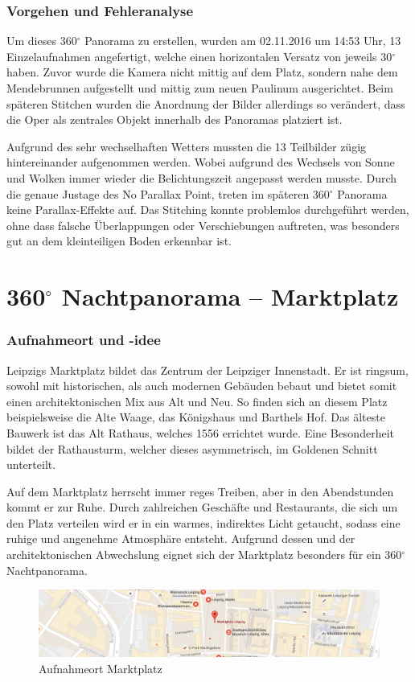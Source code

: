 \documentclass[liststotoc,bibtotoc,fontsize=14pt,]{scrreprt}
\begin{document}
	\subsubsection{Vorgehen und Fehleranalyse}
	Um dieses 360$^\circ$ Panorama zu erstellen, wurden am 02.11.2016 um 14:53 Uhr, 13 Einzelaufnahmen angefertigt, welche einen horizontalen Versatz von jeweils 30$^\circ$ haben. Zuvor wurde die Kamera nicht mittig auf dem Platz, sondern nahe dem Mendebrunnen aufgestellt und mittig zum neuen Paulinum ausgerichtet. Beim späteren Stitchen wurden die Anordnung der Bilder allerdings so verändert, dass die Oper als zentrales Objekt innerhalb des Panoramas platziert ist. 
	
	\bigskip
		Aufgrund des sehr wechselhaften Wetters mussten die 13 Teilbilder zügig hintereinander aufgenommen werden. Wobei aufgrund des Wechsels von Sonne und Wolken immer wieder die Belichtungszeit angepasst werden musste. Durch die genaue Justage des No Parallax Point, treten im späteren 360$^\circ$ Panorama keine Parallax-Effekte auf. Das Stitching konnte problemlos durchgeführt werden, ohne dass falsche Überlappungen oder Verschiebungen auftreten, was besonders gut an dem kleinteiligen Boden erkennbar ist.

	
	\section{360$^\circ$ Nachtpanorama -- Marktplatz}
	\label{sec:markt}
		\subsubsection{Aufnahmeort und -idee}
		Leipzigs Marktplatz bildet das Zentrum der Leipziger Innenstadt. Er ist ringsum, sowohl mit historischen, als auch modernen Gebäuden bebaut und bietet somit einen architektonischen Mix aus Alt und Neu. So finden sich an diesem Platz beispielsweise die Alte Waage, das Königshaus und Barthels Hof. Das älteste Bauwerk ist das Alt Rathaus, welches 1556 errichtet wurde. Eine Besonderheit bildet der Rathausturm, welcher dieses asymmetrisch, im Goldenen Schnitt unterteilt. 
		
		\bigskip
		Auf dem Marktplatz herrscht immer reges Treiben, aber in den Abendstunden kommt er zur Ruhe. Durch zahlreichen Geschäfte und Restaurants, die sich um den Platz verteilen wird er in ein warmes, indirektes Licht getaucht, sodass eine ruhige und angenehme Atmosphäre entsteht. Aufgrund dessen und der architektonischen Abwechslung eignet sich der Marktplatz besonders für ein 360$^\circ$ Nachtpanorama.
		\begin{figure}[H]
			\includegraphics[width=\linewidth]{img/places/mp_map.jpg}
			\caption{Aufnahmeort Marktplatz}
			\label{img:mp_map}
		\end{figure}
		
\end{document}
